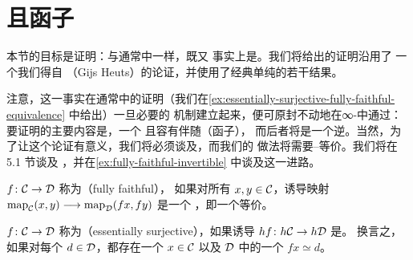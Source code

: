 \section{\trFullyFaithful{}且\trEssentiallySurjective{}函子}
\label{sec:fully-faithful-essentially-surjective}

本节的目标是证明：与通常\trCategoryTheory{}中一样，既\trEssentiallySurjective{}又%
\trFullyFaithful{}\trFunctor{}事实上是\trInvertible{}。我们将给出的证明沿用了
一个我们得自%
\trHeuts{}（Gijs Heuts）的论证，并使用了经典单纯\trHomotopyTheory{}的若干结果。

\begin{remark}\label{rem:adjoint-approach}
注意，这一事实在通常\trCategoryTheory{}中的证明（我们在\cref{ex:essentially-surjective-fully-faithful-equivalence} 中给出）一旦必要的
机制建立起来，便可原封不动地在∞-\trCategories{}中通过：要证明的主要内容是，一个%
\trEssentiallySurjective{}且\trFullyFaithful{}\trFunctor{}容有伴随（函子），
而后者将是一个逆。当然，为了让这个论证有意义，我们将必须谈及\trAdjunction{}，而我们的
做法将需要\trStraightening{}–\trUnstraightening{}等价。我们将在 5.1 节谈及%
\trAdjunction{}，并在\cref{ex:fully-faithful-invertible} 中谈及这一进路。
\end{remark}

\begin{definition}\label{def:fully-faithful}
\trFunctor{} $f\colon \mathcal{C} \to \mathcal{D}$ 称为\emph{\trFullyFaithful{}}（fully faithful），
如果对所有\trObject{} $x, y \in \mathcal{C}$，诱导映射
$\mathrm{map}_{\mathcal{C}}(x, y) \longrightarrow \mathrm{map}_{\mathcal{D}}(fx, fy)$ 是一个%
\trJoyalEquivalence{}，即一个\trHomotopy{}等价。
\end{definition}

\begin{definition}\label{def:essentially-surjective}
\trFunctor{} $f\colon \mathcal{C} \to \mathcal{D}$ 称为\emph{\trEssentiallySurjective{}}（essentially
surjective），如果诱导\trFunctor{} $hf\colon h\mathcal{C} \to h\mathcal{D}$ 是\trEssentiallySurjective{}。
换言之，如果对每个\trObject{} $d \in \mathcal{D}$，都存在一个\trObject{} $x \in \mathcal{C}$ 以及
$\mathcal{D}$ 中的一个\trEquivalence{} $fx \simeq d$。
\end{definition}

